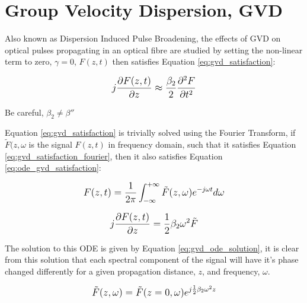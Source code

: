 \documentclass[colorlinks,11pt,a4paper,normalphoto,withhyper,ragged2e]{altareport}
\begin{document}
		
		\pagebreak
		
		
\section{Group Velocity Dispersion, GVD}

Also known as Dispersion Induced Pulse Broadening, the effects of GVD on optical pulses propagating in an optical fibre are studied by setting the non-linear term to zero, $\gamma = 0$, $F(z, t)$ then satisfies Equation \ref{eq:gvd_satisfaction}:

	\begin{equation} \label{eq:gvd_satisfaction}
		\mathlarger{ j \frac{\partial F(z, t)}{\partial z} \approx \frac{ \beta_2}{2} \frac{\partial^2 F}{\partial t^2} }
	\end{equation}
	
	{\footnotesize Be careful, $\beta_2 \neq \beta ''$} \linebreak	
	
	\vspace{5mm}

Equation \ref{eq:gvd_satisfaction} is trivially solved using the Fourier Transform, if $\tilde{F}(z, \omega$ is the signal $F(z, t)$ in frequency domain, such that it satisfies Equation \ref{eq:gvd_satisfaction_fourier}, then it also satisfies Equation \ref{eq:ode_gvd_satisfaction}:
	
	\begin{equation} \label{eq:gvd_satisfaction_fourier}
		\mathlarger{F(z, t) = \frac{1}{2 \pi} \int_{-\infty}^{+\infty} \tilde{F}(z, \omega) e^{-j \omega t} d \omega}
	\end{equation}
	
	\vspace{5mm}

	\begin{equation} \label{eq:ode_gvd_satisfaction}
		\mathlarger{ j \frac{\partial F(z, t)}{\partial z} = \frac{1}{2} \beta_2 \omega^2 \tilde{F} }
	\end{equation}
	
	\vspace{5mm}
	
The solution to this ODE is given by Equation \ref{eq:gvd_ode_solution}, it is clear from this solution that each spectral component of the signal will have it's phase changed differently for a given propagation distance, $z$, and frequency, $\omega$.
	
	\begin{equation} \label{eq:gvd_ode_solution}
		\mathlarger{ \tilde{F}(z, \omega) = \tilde{F}(z=0, \omega) e^{j \frac{1}{2} \beta_2 \omega^2 z} }
	\end{equation}
\end{document}
